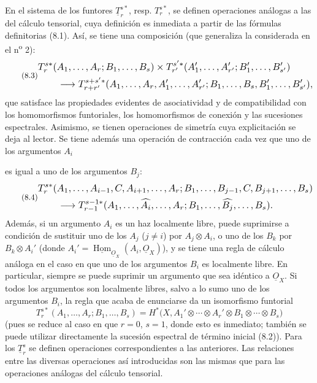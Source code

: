 \documentclass[11pt,twoside,openany]{book}
\numberwithin{equation}{section}
\newcommand{\src}[1]{%
  \phantomsection\hypertarget{src:#1}{}%
  \marginpar{\raggedleft\footnotesize\sffamily #1}%
}
\newcommand{\Osh}{\underline{O}}
\newcommand{\Homsh}{\underline{\operatorname{Hom}}}
\theoremstyle{plain}
\theoremstyle{definition}
\theoremstyle{remark}
\newcommand{\FgaUnitKey}{frontmatter}
\renewcommand{\src}[1]{%
  \phantomsection\hypertarget{src:\FgaUnitKey:#1}{}%
  \marginpar{\raggedleft\footnotesize\sffamily #1}%
}
\theoremstyle{plain}
\theoremstyle{definition}
\theoremstyle{remark}
\begin{document}
En el sistema de los funtores $\underline{T}_{r}^{s*}$, resp.
$T_{r}^{s*}$, se definen operaciones análogas a las del cálculo tensorial, cuya
definición es inmediata a partir de las fórmulas definitorias (8.1). Así, se tiene
una composición (que generaliza la considerada en el n\textsuperscript{o} 2):
\begin{equation}\tag{8.3}
\resizebox{\textwidth}{!}{$
\begin{aligned}
&T_{r}^{s*}(A_1,\ldots,A_r;B_1,\ldots,B_s)
\times T_{r'}^{s'*}(A'_1,\ldots,A'_{r'};B'_1,\ldots,B'_{s'})\\
&\qquad\longrightarrow
T_{r+r'}^{s+s'*}
(A_1,\ldots,A_r,A'_1,\ldots,A'_{r'};
 B_1,\ldots,B_s,B'_1,\ldots,B'_{s'}),
\end{aligned}
$}
\end{equation}
que satisface las propiedades evidentes de asociatividad y de compatibilidad con
los homomorfismos funtoriales, los homomorfismos de conexión y las sucesiones
espectrales. Asimismo, se tienen operaciones de simetría cuya explicitación se deja al
lector. Se tiene además una operación de contracción cada vez que
uno de los argumentos $A_i$

\src{191}
es igual a uno de los argumentos $B_j$:
\begin{equation}\tag{8.4}
\resizebox{\textwidth}{!}{$
\begin{aligned}
&T_{r}^{s*}(A_1,\ldots,A_{i-1},C,A_{i+1},\ldots,A_r;
 B_1,\ldots,B_{j-1},C,B_{j+1},\ldots,B_s)\\
&\qquad\longrightarrow
T_{r-1}^{s-1*}(A_1,\ldots,\widehat{A_i},\ldots,A_r;
 B_1,\ldots,\widehat{B_j},\ldots,B_s).
\end{aligned}
$}
\end{equation}
Además, si un argumento $A_i$ es un haz localmente libre, puede
suprimirse a condición de sustituir uno de los $A_j$ ($j\neq i$) por
$A_j\otimes A_i$, o uno de los $B_k$ por $B_k\otimes A_i'$ (donde
$A_i'=\Homsh_{\Osh_X}(A_i,\Osh_X)$), y se tiene una regla de cálculo análoga en
el caso en que uno de los argumentos $B_i$ es localmente libre. En particular, siempre
se puede suprimir un argumento que sea idéntico a $\Osh_X$. Si todos los
argumentos son localmente libres, salvo a lo sumo uno de los argumentos $B_i$, la regla
que acaba de enunciarse da un isomorfismo funtorial
\begin{equation}\tag{8.5}
  T_{r}^{s*}(A_1,\ldots,A_r;B_1,\ldots,B_s)
  =H^{*}\bigl(X,A_1'\otimes\cdots\otimes A_r'
    \otimes B_1\otimes\cdots\otimes B_s\bigr)
\end{equation}
(pues se reduce al caso en que $r=0$, $s=1$, donde esto es inmediato; también se
puede utilizar directamente la sucesión espectral de término inicial (8.2)). Para los
$\underline{T}_{r}^{s}$ se definen operaciones correspondientes a las anteriores.
Las relaciones entre las diversas operaciones así
introducidas son las mismas que para las operaciones análogas del cálculo
tensorial.
\end{document}
